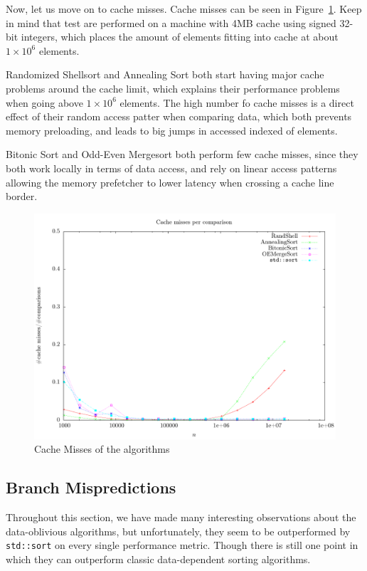 Now, let us move on to cache misses. Cache misses can be seen in Figure~\ref{fig:Performance:cachemisses}.
Keep in mind that test are performed on a machine with 4MB cache using signed 32-bit integers, which places the amount of elements fitting into cache at about $1 \times 10^6$ elements.

Randomized Shellsort and Annealing Sort both start having major cache problems around the cache limit, which explains their performance problems when going above  $1 \times 10^6$ elements. The high number fo cache misses is a direct effect of their random access patter when comparing data, which both prevents memory preloading, and leads to big jumps in accessed indexed of elements.

Bitonic Sort and Odd-Even Mergesort both perform few cache misses, since they both work locally in terms of data access, and rely on linear access patterns allowing the memory prefetcher to lower latency when crossing a cache line border.

\begin{figure}
\center
\includegraphics[width=\textwidth]{graphs/Performance/cache-misses.pdf}
\caption{Cache Misses of the algorithms}
\label{fig:Performance:cachemisses}
\end{figure}

\subsection{Branch Mispredictions}

Throughout this section, we have made many interesting observations about the data-oblivious algorithms, but unfortunately, they seem to be outperformed by \texttt{std::sort} on every single performance metric. Though there is still one point in which they can outperform classic data-dependent sorting algorithms.

